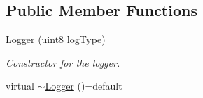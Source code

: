 \subsection*{Public Member Functions}
\begin{DoxyCompactItemize}
\item 
\hyperlink{class_a_p_i_kachu_1_1_logger_a0f36a216974696dc4b5e55bfe77a1bfa}{Logger} (uint8 log\+Type)
\begin{DoxyCompactList}\small\item\em Constructor for the logger. \end{DoxyCompactList}\item 
virtual \hyperlink{class_a_p_i_kachu_1_1_logger_a8654a8cafaae01e3cdb8d8ba2bd9621a}{$\sim$\+Logger} ()=default\hypertarget{class_a_p_i_kachu_1_1_logger_a8654a8cafaae01e3cdb8d8ba2bd9621a}{}\label{class_a_p_i_kachu_1_1_logger_a8654a8cafaae01e3cdb8d8ba2bd9621a}


\end{DoxyCompactItemize}
